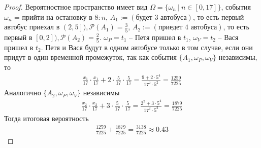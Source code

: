     \begin{proof}
        Вероятностное пространство имеет вид $\Omega = \{\omega_n\ |\ n \in [0,17]\}$, события $\omega_n$ = прийти на остановку в $8:n$, $A_1 := (\text{будет 3 автобуса})$, то есть первый автобус приехал в $\left(2, 5\right]), \mathcal{P}(A_1) = \frac{3}{5}$, $A_2 := (\text{приедет 4 автобуса})$, то есть первый в $\left[0, 2\right]), \mathcal{P}(A_2) = \frac{2}{5}$. $\omega_{P} = t_1$ -- Петя пришел в $t_1$, $\omega_{V} = t_2$ -- Вася пришел в $t_2$. Петя и Вася будут в одном автобусе только в том случае, если они придут в один временной промежуток, так как события $\{A_1, \omega_{P}, \omega_{V}\}$ независимы, то
        \begin{gather*}
            \frac{x_1}{17} \cdot \frac{x_1}{17} + 2 \cdot \frac{5}{17} \cdot \frac{5}{17}
            = \frac{9 + 2 \cdot 5^4}{17^2 \cdot 5^2}
            = \frac{1259}{7225}
        \end{gather*}
        Аналогично $\{A_2, \omega_{P}, \omega_{V}\}$ независимы
        \begin{gather*}
            \frac{x_2}{17} \cdot \frac{x_2}{17} + 3 \cdot \frac{5}{17} \cdot \frac{5}{17}
            = \frac{2^2 + 3 \cdot 5^4}{17^2 \cdot 5^2}
            = \frac{1879}{7225}
        \end{gather*}
        Тогда итоговая вероятность
        \begin{gather*}
            \frac{1259}{7225} + \frac{1879}{7225}
            = \frac{3138}{7225}
            \approx 0.43
        \end{gather*}
    \end{proof}
\vskip 0.6in


